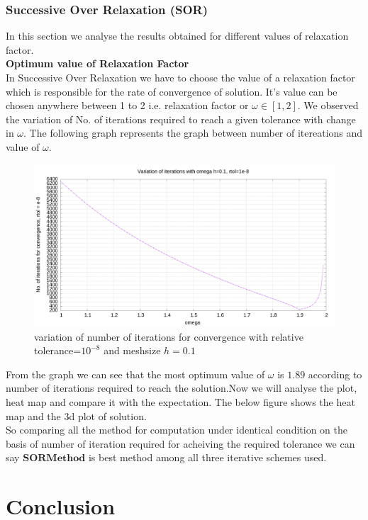 \subsubsection{Successive Over Relaxation (SOR)}
In this section we analyse the results obtained for different values of relaxation factor. \\[2mm]
\noindent
\textbf{ Optimum value of Relaxation Factor } \\
In Successive Over Relaxation we have to choose the value of a relaxation factor which is responsible for the rate of convergence of solution. It's value can be chosen anywhere between 1 to 2 i.e. relaxation factor or $\omega  \in [1,2]$. We observed the variation of No. of iterations required to reach a given tolerance with change in $ \omega $. The following graph represents the graph between number of itereations and value of $\omega$. \\
\begin{figure}[ht]
    \centering
    \includegraphics[width=\textwidth]{content/graphs/omega.png}
    \caption{variation of number of iterations for convergence with relative tolerance=$10^{-8}$ and meshsize $h = 0.1$  }
    \label{omega variation}
\end{figure}
From the graph we can see that the most optimum value of $ \omega $ is $1.89$ according to number of iterations required to reach the solution.Now we will analyse the plot, heat map and  compare it with the expectation. The below figure shows the heat map and the 3d plot of solution. \\

So comparing all the method for computation under identical condition on the basis of number of iteration required for acheiving the required tolerance we can say $ \boldsymbol{SOR Method} $ is best method among all three iterative schemes used.
\newpage
\section{Conclusion}
